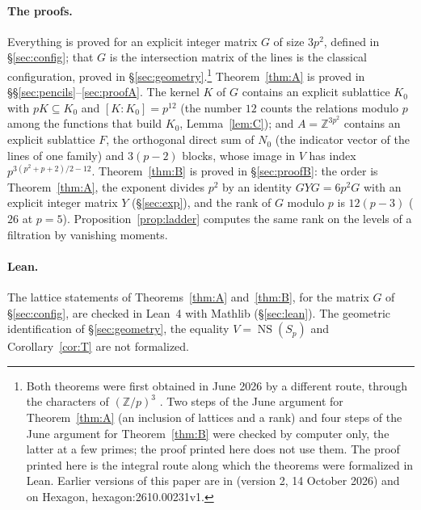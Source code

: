 \documentclass[11pt]{article}
\theoremstyle{definition}
\theoremstyle{remark}
\newcommand{\Z}{\mathbb{Z}}
\newcommand{\NS}{\operatorname{NS}}
\newcommand{\SAT}{K_0}
\begin{document}
\paragraph{The proofs.} Everything is proved for an explicit integer matrix $G$ of size $3p^2$, defined in \S\ref{sec:config}; that $G$ is the intersection matrix of the lines is the classical configuration, proved in \S\ref{sec:geometry}.\footnote{Both theorems were first obtained in June 2026 by a different route, through the characters of $(\Z/p)^3$ \cite{WM,DL}. Two steps of the June argument for Theorem~\ref{thm:A} (an inclusion of lattices and a rank) and four steps of the June argument for Theorem~\ref{thm:B} were checked by computer only, the latter at a few primes; the proof printed here does not use them. The proof printed here is the integral route along which the theorems were formalized in Lean. Earlier versions of this paper are in \cite{WMDLZenodo} (version 2, 14 October 2026) and on Hexagon, hexagon:2610.00231v1.} Theorem~\ref{thm:A} is proved in \S\S\ref{sec:pencils}--\ref{sec:proofA}. The kernel $K$ of $G$ contains an explicit sublattice $\SAT$ with $pK\subseteq\SAT$ and $[K:\SAT]=p^{12}$ (the number $12$ counts the relations modulo $p$ among the functions that build $\SAT$, Lemma~\ref{lem:C}); and $A=\Z^{3p^2}$ contains an explicit sublattice $F$, the orthogonal direct sum of $N_0$ (the indicator vector of the lines of one family) and $3(p-2)$ blocks, whose image in $V$ has index $p^{3(p^2+p+2)/2-12}$. Theorem~\ref{thm:B} is proved in \S\ref{sec:proofB}: the order is Theorem~\ref{thm:A}, the exponent divides $p^2$ by an identity $GYG=6p^2G$ with an explicit integer matrix $Y$ (\S\ref{sec:exp}), and the rank of $G$ modulo $p$ is $12(p-3)$ ($26$ at $p=5$). Proposition~\ref{prop:ladder} computes the same rank on the levels of a filtration by vanishing moments.

\paragraph{Lean.} The lattice statements of Theorems~\ref{thm:A} and~\ref{thm:B}, for the matrix $G$ of \S\ref{sec:config}, are checked in Lean~4 with Mathlib (\S\ref{sec:lean}). The geometric identification of \S\ref{sec:geometry}, the equality $V=\NS(S_p)$ \cite{SSvL,Deg} and Corollary~\ref{cor:T} are not formalized.
\end{document}
